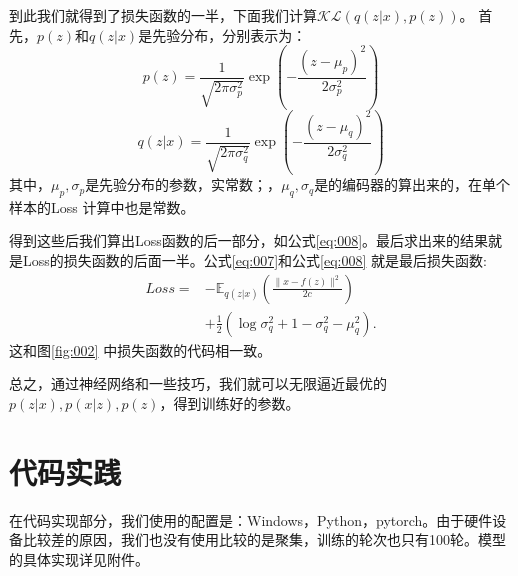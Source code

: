 \documentclass[twocolumn]{article}
\begin{document}
    到此我们就得到了损失函数的一半，下面我们计算$ \mathcal{KL}(q(z|x), p(z)) $。
    首先，$ p(z) $和$ q(z|x) $是先验分布，分别表示为：
\begin{equation}
    p(z) = \frac{1}{\sqrt{2\pi\sigma_p^2}}\exp\left( -\frac{(z-\mu_p)^2}{2\sigma_p^2} \right)
    \label{eq:009}
\end{equation}
\begin{equation}
    q(z|x) = \frac{1}{\sqrt{2\pi\sigma_q^2}}\exp\left( -\frac{(z-\mu_q)^2}{2\sigma_q^2} \right)
    \label{eq:010}
\end{equation}
    其中，$ \mu_p,\sigma_p $是先验分布的参数，实常数；，$ \mu_q,\sigma_q $是的编码器的算出来的，在单个样本的Loss
    计算中也是常数。
    
    得到这些后我们算出Loss函数的后一部分，如公式\eqref{eq:008}。最后求出来的结果就是Loss的损失函数的后面一半。公式\eqref{eq:007}和公式\eqref{eq:008}
    就是最后损失函数:
\begin{equation}
    \begin{aligned}
        Loss =& - \mathbb{E}_{q(z|x)}(\frac{\lVert x-f(z) \rVert^2}{2c}) \\
              & + \frac{1}{2}\left( \log\sigma_q^2  +  1 - \sigma_q^2 - \mu_q^2  \right).
    \end{aligned}
    \label{eq:011}
\end{equation}
    这和图\ref{fig:002} 中损失函数的代码相一致。
    
    总之，通过神经网络和一些技巧，我们就可以无限逼近最优的$ p(z|x), p(x|z), p(z) $，得到训练好的参数。
\section{代码实践}
    在代码实现部分，我们使用的配置是：Windows，Python，pytorch。由于硬件设备比较差的原因，我们也没有使用比较的是聚集，训练的轮次也只有100轮。模型的具体实现详见附件。
\end{document}
